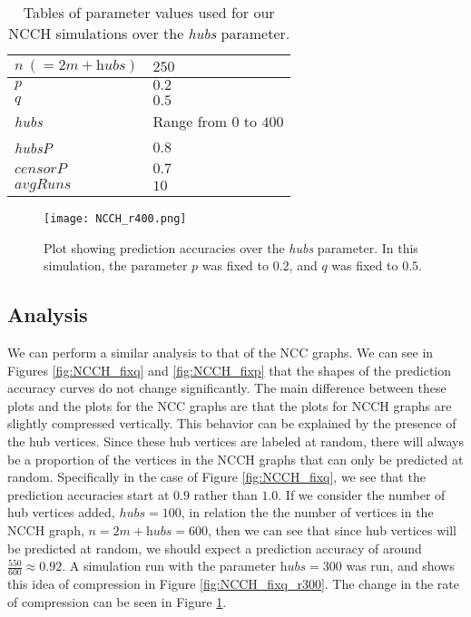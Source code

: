 \begin{table}[H]
\centering
\begin{tabular}{|l|l|}
\hline
$n ~(= 2m + \textit{hubs})$ & $250$ \\ \hline
$p$ & $0.2$\\ \hline
$q$ & $0.5$\\ \hline
\textit{hubs} & Range from $0$ to $400$\\ \hline
\textit{hubsP} & $0.8$\\ \hline
$censorP$ & $0.7$\\ \hline
$avgRuns$ & $10$\\ \hline
\end{tabular}
\caption{Tables of parameter values used for our NCCH simulations over the \textit{hubs} parameter.}
\label{table:NCCH-params-r}
\end{table}

\begin{figure}[H]
\centering
\texttt{[image: NCCH\_r400.png]}
\caption{Plot showing prediction accuracies over the \textit{hubs} parameter. In this simulation, the parameter $p$ was fixed to $0.2$, and $q$ was fixed to $0.5$.}
\label{fig:NCCH_r400}
\end{figure}

\subsection{Analysis}
We can perform a similar analysis to that of the NCC graphs. We can see
in Figures \ref{fig:NCCH_fixq} and \ref{fig:NCCH_fixp} that the shapes of 
the prediction accuracy curves do not change significantly. The main
difference between these plots and the plots for the NCC graphs are that
the plots for NCCH graphs are slightly compressed vertically. This behavior
can be explained by the presence of the hub vertices. Since these hub
vertices are labeled at random, there will always be a proportion of the
vertices in the NCCH graphs that can only be predicted at random. 
Specifically in the case of Figure \ref{fig:NCCH_fixq}, we see that the
prediction accuracies start at $0.9$ rather than $1.0$. If we consider the
number of hub vertices added, $hubs=100$, in relation the the number of
vertices in the NCCH graph, $n = 2m + \textit{hubs} = 600$, then we can see that since
hub vertices will be predicted at random, we should expect a prediction
accuracy of around $\frac{550}{600} \approx 0.92$. A simulation run with
the parameter $\textit{hubs}=300$ was run, and shows this idea of compression in
Figure \ref{fig:NCCH_fixq_r300}. The change in the rate of compression can
be seen in Figure \ref{fig:NCCH_r400}.

